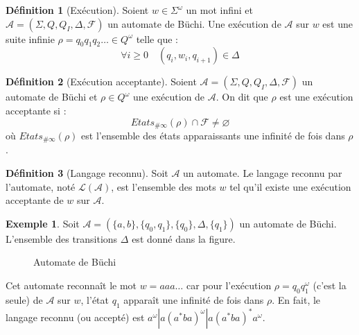 \documentclass[12pt,a4paper]{article}
\theoremstyle{plain}
\theoremstyle{definition}
\newtheorem{defi}{Définition}
\newtheorem{ex}{Exemple}
\begin{document}
\begin{defi}[Exécution]
  Soient $w \in \Sigma^\omega$ un mot infini et $\mathcal{A}=(\Sigma, Q, Q_I, \Delta, \mathscr{F})$ un automate de Büchi.
  Une exécution de $\mathcal{A}$ sur $w$ est une suite infinie $\rho = q_0q_1q_2\dots \in Q^\omega$ telle que :
  \[
    \forall i \geq 0 \quad (q_i, w_i, q_{i+1}) \in \Delta
  \]
\end{defi}

\begin{defi}[Exécution acceptante]
  \label{exec-accept}
  Soient $\mathcal{A}=(\Sigma, Q, Q_I, \Delta, \mathscr{F})$ un automate de Büchi et $\rho \in Q^\omega$ une exécution de $\mathcal{A}$.
  On dit que $\rho$ est une exécution acceptante si :
  \[
    Etats_{\#\infty}(\rho) \cap \mathscr{F} \neq \varnothing
  \]
  où $Etats_{\#\infty}(\rho)$ est l'ensemble des états apparaissants une infinité de fois dans $\rho$.
\end{defi}

\begin{defi}[Langage reconnu]
  Soit $\mathcal{A}$ un automate.
  Le langage reconnu par l'automate, noté $\mathcal{L}(\mathcal{A})$, est l'ensemble des mots $w$ tel qu'il existe une exécution acceptante de $w$ sur $\mathcal{A}$.
\end{defi}

\begin{ex}
  Soit $\mathcal{A}=(\{a,b\}, \{q_0, q_1\}, \{q_0\}, \Delta, \{q_1\})$ un automate de Büchi.
  L'ensemble des transitions $\Delta$ est donné dans la figure.
  \begin{figure}[h]
    \centering
    \caption{Automate de Büchi}
  \end{figure}
  
  Cet automate reconnaît le mot $w = aaa\dots$ car pour l'exécution $\rho = q_0q_1^\omega$ (c'est la seule) de $\mathcal{A}$ sur $w$, l'état $q_1$ apparaît une infinité de fois dans $\rho$.
  En fait, le langage reconnu (ou accepté) est $a^\omega | a(a^*ba)^\omega | a(a^*ba)^*a^\omega$.
\end{ex}
\end{document}
